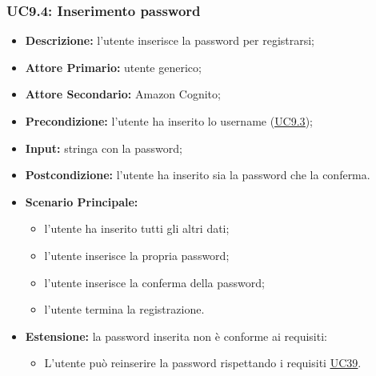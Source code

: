 \subsubsection{UC9.4: Inserimento password}
\label{sec:UC9.4}
\begin{itemize}
    \item \textbf{Descrizione:} l'utente inserisce la password per registrarsi;
    \item \textbf{Attore Primario:} utente generico;
    \item \textbf{Attore Secondario:} Amazon Cognito;
    \item \textbf{Precondizione:} l'utente ha inserito lo username (\hyperref[sec:UC9.3]{\underline{UC9.3}});
    \item \textbf{Input:} stringa con la password;
    \item \textbf{Postcondizione:} l'utente ha inserito sia la password che la conferma.
    \item \textbf{Scenario Principale:}
          \begin{itemize}
              \item l'utente ha inserito tutti gli altri dati;
              \item l'utente inserisce la propria password;
              \item l'utente inserisce la conferma della password;
              \item l'utente termina la registrazione.
          \end{itemize}
    \item \textbf{Estensione:} la password inserita non è conforme ai requisiti:
          \begin{itemize}
              \item L'utente può reinserire la password rispettando i requisiti \underline{\hyperref[sec:UC39]{UC39}}.
          \end{itemize}
\end{itemize}